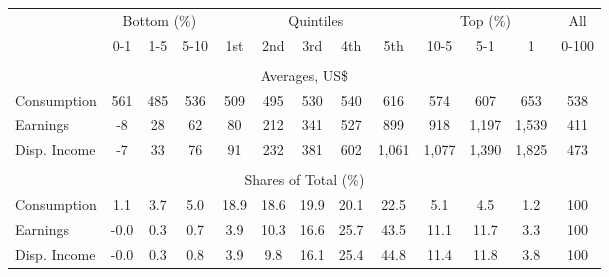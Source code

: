 \begin{tabular}{l c c c| c c c c c| c c c| c}
\toprule
&\multicolumn{3}{c|}{Bottom (\%)} & \multicolumn{5}{c|}{Quintiles} & \multicolumn{3}{c|}{Top (\%)} & All  \\
& 0-1 & 1-5 & 5-10 &  1st & 2nd & 3rd & 4th & 5th & 10-5 & 5-1 & 1 & 0-100 \\
\midrule \\
\multicolumn{13}{c}{Averages, US\$} \\
\midrule
Consumption  & 561  & 485  & 536  & 509  & 495  & 530  & 540  & 616  & 574  & 607  & 653  & 538 \\
Earnings         & -8 & 28 & 62 & 80 & 212 & 341 & 527 & 899 & 918 & 1,197 & 1,539 & 411 \\
Disp. Income & -7 & 33 & 76 & 91 & 232 & 381 & 602 & 1,061 & 1,077 & 1,390 & 1,825 & 473 \\
\midrule \\
\multicolumn{13}{c}{Shares of Total (\%)} \\
\midrule
Consumption  & 1.1   & 3.7   & 5.0   & 18.9   & 18.6   & 19.9   & 20.1   & 22.5   & 5.1   & 4.5   & 1.2   & 100 \\
Earnings         & -0.0  & 0.3  & 0.7  & 3.9  & 10.3  & 16.6  & 25.7  & 43.5  & 11.1  & 11.7  & 3.3  & 100 \\
Disp. Income & -0.0  & 0.3  & 0.8  & 3.9  & 9.8  & 16.1  & 25.4  & 44.8  & 11.4  & 11.8  & 3.8  & 100 \\
\bottomrule
\end{tabular}